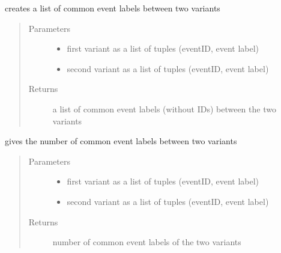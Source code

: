 \documentclass[letterpaper,10pt,english]{sphinxmanual}
\begin{document}
\begin{fulllineitems}
\label{\detokenize{cost function:costFunction.mappings.commonLabels}}
creates a list of common event labels between two variants
\begin{quote}\begin{description}
\item[{Parameters}] \leavevmode\begin{itemize}
\item {} 
 \textendash{} first variant as a list of tuples (eventID, event label)

\item {} 
 \textendash{} second variant as a list of tuples (eventID, event label)

\end{itemize}

\item[{Returns}] \leavevmode
a list of common event labels (without IDs) between the two variants

\end{description}\end{quote}

\end{fulllineitems}


\begin{fulllineitems}
\label{\detokenize{cost function:costFunction.mappings.getNumberOfCommonLabels}}
gives the number of common event labels between two variants
\begin{quote}\begin{description}
\item[{Parameters}] \leavevmode\begin{itemize}
\item {} 
 \textendash{} first variant as a list of tuples (eventID, event label)

\item {} 
 \textendash{} second variant as a list of tuples (eventID, event label)

\end{itemize}

\item[{Returns}] \leavevmode
number of common event labels of the two variants

\end{description}\end{quote}

\end{fulllineitems}
\end{document}
